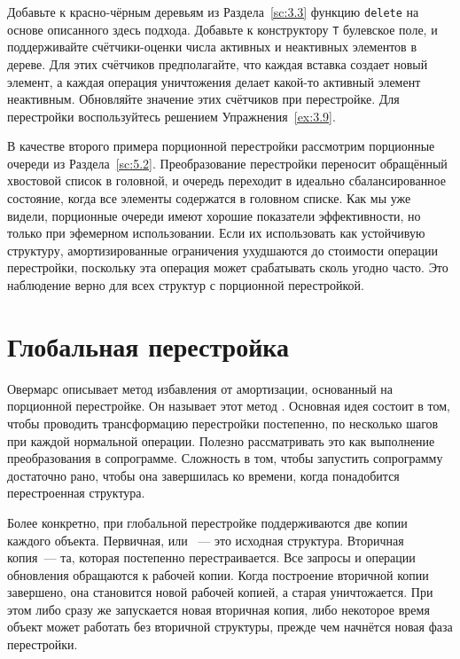 \begin{exercise}\label{ex:8.1}
  Добавьте к красно-чёрным деревьям из Раздела~\ref{sc:3.3} функцию
  \lstinline!delete! на основе описанного здесь подхода. Добавьте к
  конструктору \lstinline!T! булевское поле, и поддерживайте
  счётчики-оценки числа
  активных и неактивных элементов в дереве. Для этих счётчиков
  предполагайте, что каждая вставка создает новый элемент, а каждая
  операция уничтожения делает какой-то активный элемент
  неактивным. Обновляйте значение этих счётчиков при перестройке.  Для
  перестройки воспользуйтесь решением Упражнения~\ref{ex:3.9}.
\end{exercise}

В качестве второго примера порционной перестройки рассмотрим
порционные очереди из Раздела~\ref{sc:5.2}. Преобразование перестройки
переносит обращённый хвостовой список в головной, и очередь переходит
в идеально сбалансированное состояние, когда все элементы содержатся в
головном списке.  Как мы уже видели, порционные очереди имеют хорошие
показатели эффективности, но только при эфемерном использовании. Если
их использовать как устойчивую структуру, амортизированные ограничения
ухудшаются до стоимости операции перестройки, поскольку эта операция
может срабатывать сколь угодно часто. Это наблюдение верно для всех
структур с порционной перестройкой.

\section{Глобальная перестройка}
\label{sc:8.2}

Овермарс \cite{Overmars183} описывает метод избавления от амортизации,
основанный на порционной перестройке. Он называет этот метод
. Основная идея
состоит в том, чтобы проводить трансформацию перестройки постепенно,
по несколько шагов при каждой нормальной операции. Полезно
рассматривать это как выполнение преобразования в
сопрограмме. Сложность в том, чтобы запустить сопрограмму достаточно
рано, чтобы она завершилась ко времени, когда понадобится
перестроенная структура.

Более конкретно, при глобальной перестройке поддерживаются две копии
каждого объекта. Первичная, или ~--- это
исходная структура. Вторичная копия~--- та, которая постепенно
перестраивается. Все запросы и операции обновления обращаются к рабочей
копии. Когда построение вторичной копии завершено, она становится
новой рабочей копией, а старая уничтожается. При этом либо сразу же
запускается новая вторичная копия, либо некоторое время объект может
работать без вторичной структуры, прежде чем начнётся новая фаза
перестройки.

